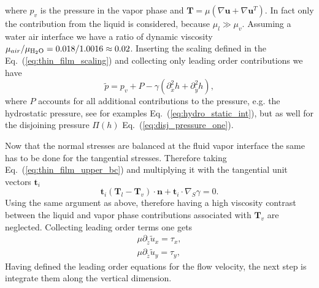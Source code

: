 where $p_v$ is the pressure in the vapor phase and $\mathbf{T} = \mu(\nabla\mathbf{u} + \nabla\mathbf{u}^T)$.
In fact only the contribution from the liquid is considered, because $\mu_l \gg \mu_v$.
Assuming a water air interface we have a ratio of dynamic viscosity $\mu_{air} / \mu_{\ce{H2O}} = 0.018/ 1.0016 \approx 0.02$.
Inserting the scaling defined in the Eq.~(\ref{eq:thin_film_scaling}) and collecting only leading order contributions we have 
\begin{equation}
    \tilde{p} = p_v + P - \gamma(\partial_{\tilde{x}}^2 h + \partial_{\tilde{y}}^2 h),
\end{equation}
where $P$ accounts for all additional contributions to the pressure, e.g. the hydrostatic pressure, see for examples Eq.~(\ref{eq:hydro_static_int}), but as well for the disjoining pressure $\Pi(h)$ Eq.~(\ref{eq:disj_pressure_one}).

Now that the normal stresses are balanced at the fluid vapor interface the same has to be done for the tangential stresses.
Therefore taking Eq.~(\ref{eq:thin_film_upper_bc}) and multiplying it with the tangential unit vectors $\mathbf{t}_i$ 
\begin{equation}\label{eq:upper_bc_tangential}
    \mathbf{t}_i(\mathbf{T}_l - \mathbf{T}_v)\cdot\mathbf{n} + \mathbf{t}_i\cdot\nabla_S\gamma = 0.
\end{equation}
Using the same argument as above, therefore having a high viscosity contrast between the liquid and vapor phase contributions associated with $\mathbf{T}_v$ are neglected.
Collecting leading order terms one gets
\begin{align}
    \mu\partial_{\tilde{z}}\tilde{u}_x = \tau_x, \label{eq:tau_x_thin}\\
    \mu\partial_{\tilde{z}}\tilde{u}_y = \tau_y, \label{eq:tau_y_thin}
\end{align}
Having defined the leading order equations for the flow velocity, the next step is integrate them along the vertical dimension.

